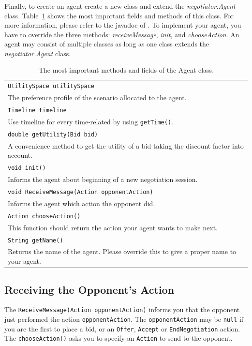 \documentclass[]{article}
\begin{document}
Finally, to create an agent create a new class and extend the \textit{negotiator.Agent} class. Table~\ref{tab:agentclass} shows the most important fields and methods of this class. For more information, please refer to the javadoc of \Genius. To implement your agent, you have to override the three methods: \textit{receiveMessage}, \textit{init}, and \textit{chooseAction}. An agent may consist of multiple classes as long as one class extends the \textit{negotiator.Agent} class.

\begin{table}[h]
\begin{tabular}{m{}}
\hline
\texttt{UtilitySpace utilitySpace}\\
The preference profile of the scenario allocated to the agent.\\
\hline
\texttt{Timeline timeline}\\
Use timeline for every time-related by using \texttt{getTime()}.\\
\hline
\texttt{double getUtility(Bid bid)}\\
A convenience method to get the utility of a bid taking the discount factor into account.\\
\hline
\texttt{void init()}\\
Informs the agent about beginning of a new negotiation session.\\
\hline
\texttt{void ReceiveMessage(Action opponentAction)}\\
Informs the agent which action the opponent did.\\
\hline
\texttt{Action chooseAction()}\\
This function should return the action your agent wants to make next.\\
\hline
\texttt{String getName()}\\
Returns the name of the agent. Please override this to give a proper name to your agent.\\
\hline
\end{tabular}
\caption{The most important methods and fields of the Agent class.}
\label{tab:agentclass}
\end{table}

\subsection{Receiving the Opponent's Action}\label{sec:receiveAction}
The \texttt{ReceiveMessage(Action opponentAction)} informs you that the opponent just performed the action \texttt{opponentAction}. The \texttt{opponentAction} may be  \texttt{null} if you are the first to place a bid, or an \texttt{Offer}, \texttt{Accept} or \texttt{EndNegotiation} action.
The \texttt{chooseAction()} asks you to specify an \texttt{Action} to send to the opponent.
\end{document}
